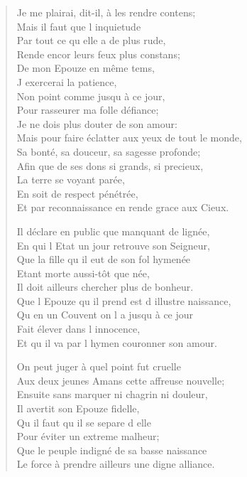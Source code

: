 \begin{verse}
\vin Je me plairai, dit-il, à les rendre contens; \\
\vin Mais il faut que l\textquotesingle{} inquietude \\
\vin Par tout ce qu\textquotesingle{} elle a de plus rude, \\
\vin Rende encor leurs feux plus constans; \\
\vin De mon Epouze en même tems, \\
\vin J\textquotesingle{} exercerai la patience, \\
\vin Non point comme jusqu\textquotesingle{} à ce jour, \\
\vin Pour rasseurer ma folle défiance; \\
\vin Je ne dois plus douter de son amour: \\
Mais pour faire éclatter aux yeux de tout le monde, \\
Sa bonté, sa douceur, sa sagesse profonde; \\
Afin que de ses dons si grands, si precieux, \\
\vin La terre se voyant parée, \\
\vin En soit de respect pénétrée, \\
Et par reconnaissance en rende grace aux Cieux.

Il déclare en public que manquant de lignée, \\
En qui l\textquotesingle{} Etat un jour retrouve son Seigneur, \\
Que la fille qu\textquotesingle{} il eut de son fol hymenée \\
\vin Etant morte aussi-tôt que née, \\
\vin Il doit ailleurs chercher plus de bonheur. \\
Que l\textquotesingle{} Epouze qu\textquotesingle{} il prend est d\textquotesingle{} illustre naissance, \\
\vin Qu\textquotesingle{} en un Couvent on l\textquotesingle{} a jusqu\textquotesingle{} à ce jour \\
\vin Fait élever dans l\textquotesingle{} innocence, \\
Et qu\textquotesingle{} il va par l\textquotesingle{} hymen couronner son amour.

\vin On peut juger à quel point fut cruelle \\
Aux deux jeunes Amans cette affreuse nouvelle; \\
Ensuite sans marquer ni chagrin ni douleur, \\
\vin Il avertit son Epouze fidelle, \\
\vin Qu\textquotesingle{} il faut qu\textquotesingle{} il se separe d\textquotesingle{} elle \\
\vin Pour éviter un extreme malheur; \\
Que le peuple indigné de sa basse naissance \\
Le force à prendre ailleurs une digne alliance.


\end{verse}
